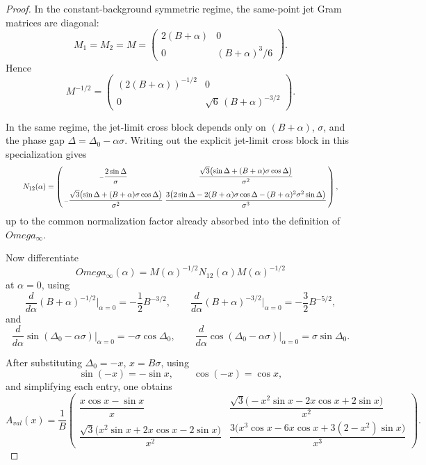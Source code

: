 \documentclass[11pt,a4paper]{amsart}
\def\Omega{Omega}%
\def\val{val}%
\theoremstyle{plain}
\theoremstyle{definition}
\newcommand{\val}{\mathrm{val}}
\begin{document}
\begin{proof}
In the constant-background symmetric regime, the same-point jet Gram matrices
are diagonal:
\[
M_1=M_2=M=
\begin{pmatrix}
2(B+\alpha) & 0\\[0.5ex]
0 & (B+\alpha)^3/6
\end{pmatrix}.
\]
Hence
\[
M^{-1/2}=
\begin{pmatrix}
(2(B+\alpha))^{-1/2} & 0\\[0.5ex]
0 & \sqrt6\,(B+\alpha)^{-3/2}
\end{pmatrix}.
\]

In the same regime, the jet-limit cross block depends only on $(B+\alpha)$,
$\sigma$, and the phase gap $\Delta=\Delta_0-\alpha\sigma$. Writing out the
explicit jet-limit cross block in this specialization gives
\[
\resizebox{.94\linewidth}{!}{$
N_{12}(\alpha)=
\left(\begin{smallmatrix}
-\dfrac{2\sin\Delta}{\sigma}
&
\dfrac{\sqrt3\bigl(\sin\Delta+(B+\alpha)\sigma\cos\Delta\bigr)}{\sigma^2}
\\[1.5ex]
-\dfrac{\sqrt3\bigl(\sin\Delta+(B+\alpha)\sigma\cos\Delta\bigr)}{\sigma^2}
&
\dfrac{3\bigl(2\sin\Delta-2(B+\alpha)\sigma\cos\Delta-(B+\alpha)^2\sigma^2\sin\Delta\bigr)}{\sigma^3}
\end{smallmatrix}\right),
$}
\]
up to the common normalization factor already absorbed into the definition of
$\Omega_\infty$.

Now differentiate
\[
\Omega_\infty(\alpha)=M(\alpha)^{-1/2}N_{12}(\alpha)M(\alpha)^{-1/2}
\]
at $\alpha=0$, using
\[
\frac{d}{d\alpha}(B+\alpha)^{-1/2}\Big|_{\alpha=0}
=-\frac12 B^{-3/2},
\qquad
\frac{d}{d\alpha}(B+\alpha)^{-3/2}\Big|_{\alpha=0}
=-\frac32 B^{-5/2},
\]
and
\[
\frac{d}{d\alpha}\sin(\Delta_0-\alpha\sigma)\Big|_{\alpha=0}
=-\sigma\cos\Delta_0,
\qquad
\frac{d}{d\alpha}\cos(\Delta_0-\alpha\sigma)\Big|_{\alpha=0}
=\sigma\sin\Delta_0.
\]

After substituting $\Delta_0=-x$, $x=B\sigma$, using
\[
\sin(-x)=-\sin x,\qquad \cos(-x)=\cos x,
\]
and simplifying each entry, one obtains
\[
A_{\val}(x)=\frac1B
\begin{pmatrix}
\dfrac{x\cos x-\sin x}{x}
&
\dfrac{\sqrt3\bigl(-x^2\sin x-2x\cos x+2\sin x\bigr)}{x^2}
\\[2.5ex]
\dfrac{\sqrt3\bigl(x^2\sin x+2x\cos x-2\sin x\bigr)}{x^2}
&
\dfrac{3\bigl(x^3\cos x-6x\cos x+3(2-x^2)\sin x\bigr)}{x^3}
\end{pmatrix}.
\]
\end{proof}
\end{document}
